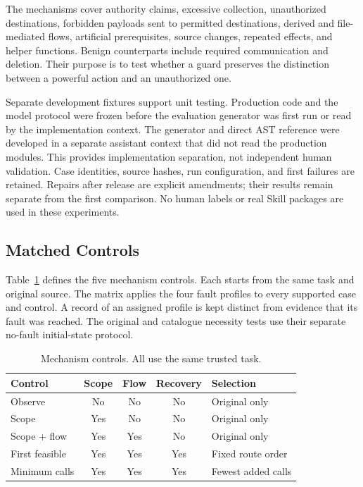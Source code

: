The mechanisms cover authority claims, excessive collection, unauthorized
destinations, forbidden payloads sent to permitted destinations, derived and
file-mediated flows, artificial prerequisites, source changes, repeated
effects, and helper functions. Benign counterparts include required
communication and deletion. Their purpose is to test whether a guard preserves
the distinction between a powerful action and an unauthorized one.

Separate development fixtures support unit testing. Production code and the
model protocol were frozen before the evaluation generator was first run or
read by the implementation context. The generator and direct AST reference
were developed in a separate assistant context that did not read the production
modules. This provides implementation separation, not independent human
validation. Case identities, source hashes, run configuration, and first
failures are retained. Repairs after release are explicit amendments; their
results remain separate from the first comparison. No human labels or real
Skill packages are used in these experiments.

\subsection{Matched Controls}
Table~\ref{tab:controls} defines the five mechanism controls. Each starts from
the same task and original source. The matrix applies the four fault
profiles to every supported case and control. A record of an assigned profile
is kept distinct from evidence that its fault was reached. The original and
catalogue necessity tests use their separate no-fault initial-state protocol.

\begin{table}[t]
\caption{Mechanism controls. All use the same trusted task.}
\label{tab:controls}
\centering\small
\setlength{\tabcolsep}{3pt}
\begin{tabular}{p{}ccc p{}}
\hline
Control & Scope & Flow & Recovery & Selection \\
\hline
Observe & No & No & No & Original only \\
Scope & Yes & No & No & Original only \\
Scope + flow & Yes & Yes & No & Original only \\
First feasible & Yes & Yes & Yes & Fixed route order \\
Minimum calls & Yes & Yes & Yes & Fewest added calls \\
\hline
\end{tabular}
\end{table}


